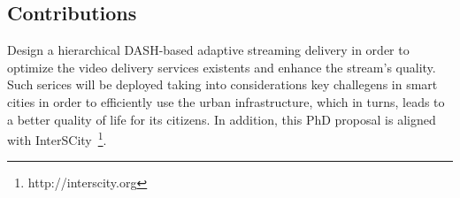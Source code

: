 \subsection*{Contributions}
\label{sec:contributions}




Design a hierarchical DASH-based adaptive streaming delivery in order to optimize the video delivery services existents and enhance the stream's quality. Such serices will be deployed taking into considerations key challegens in smart cities in order to efficiently use the urban infrastructure, which in turns, leads to a better quality of life for its citizens.
In addition, this PhD proposal is aligned with InterSCity~\footnote{http://interscity.org}.


%
%


